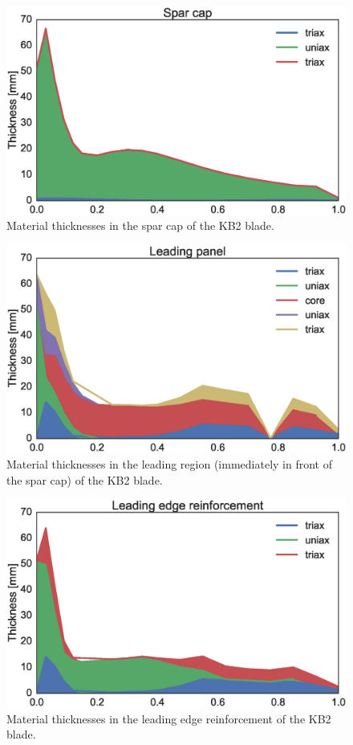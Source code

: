 \begin{figure}[!ht]
\begin{center}
	\includegraphics[width=.85\linewidth]{figures/KB2_region04.eps}
\end{center}
\caption{Material thicknesses in the spar cap of the KB2 blade.}
\label{fig:KB2matstackr04}
\end{figure}

\begin{figure}[!ht]
\begin{center}
	\includegraphics[width=.85\linewidth]{figures/KB2_region06.eps}
\end{center}
\caption{Material thicknesses in the leading region (immediately in front of the spar cap) of the KB2 blade.}
\label{fig:KB2matstackr06}
\end{figure}

\begin{figure}[!ht]
\begin{center}
	\includegraphics[width=.85\linewidth]{figures/KB2_region07.eps}
\end{center}
\caption{Material thicknesses in the leading edge reinforcement of the KB2 blade.}
\label{fig:KB2matstackr07}
\end{figure}

